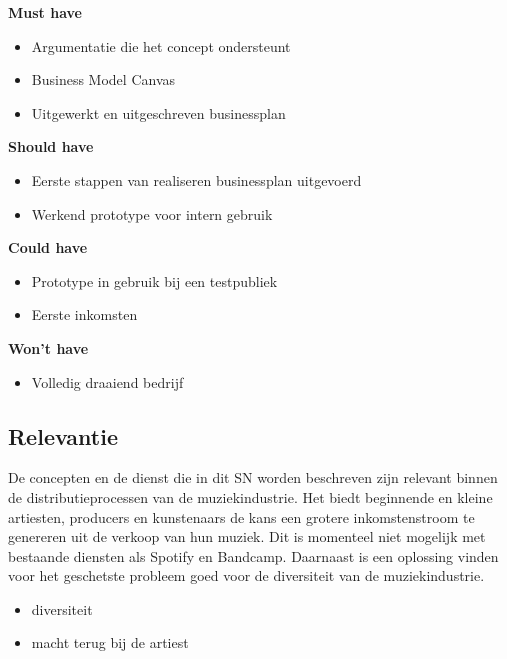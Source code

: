 \parbox{\textwidth}{
    \textbf{Must have}
    \begin{itemize}
        \item Argumentatie die het concept ondersteunt
        \item Business Model Canvas
        \item Uitgewerkt en uitgeschreven businessplan
    \end{itemize}
    \textbf{Should have}
    \begin{itemize}
        \item Eerste stappen van realiseren businessplan uitgevoerd
        \item Werkend prototype voor intern gebruik
    \end{itemize}
    \textbf{Could have}
    \begin{itemize}
        \item Prototype in gebruik bij een testpubliek
        \item Eerste inkomsten
    \end{itemize}
    \textbf{Won't have}
    \begin{itemize}
        \item Volledig draaiend bedrijf
    \end{itemize}
}

\subsection{Relevantie}
De concepten en de dienst die in dit SN worden beschreven zijn relevant binnen de distributieprocessen van de muziekindustrie. Het biedt beginnende en kleine artiesten, producers en kunstenaars de kans een grotere inkomstenstroom te genereren uit de verkoop van hun muziek. Dit is momenteel niet mogelijk met bestaande diensten als Spotify en Bandcamp. Daarnaast is een oplossing vinden voor het geschetste probleem goed voor de diversiteit van de muziekindustrie.

\begin{itemize}
    \item diversiteit
    \item macht terug bij de artiest
\end{itemize}

